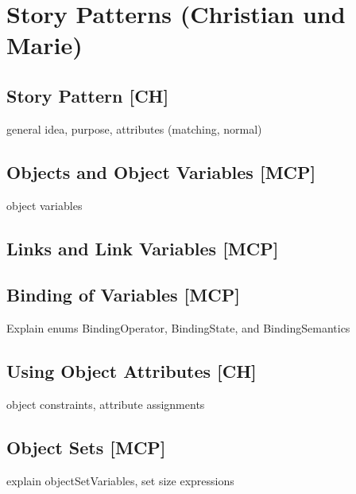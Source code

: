 \section{Story Patterns (Christian und Marie)} \label{sec:StoryPatterns}



\subsection{Story Pattern [CH]}

general idea, purpose, attributes (matching, normal)

\subsection{Objects and Object Variables [MCP]}

object variables

\subsection{Links and Link Variables [MCP]}

\subsection{Binding of Variables [MCP]}

Explain enums BindingOperator, BindingState, and BindingSemantics

\subsection{Using Object Attributes [CH]}

object constraints, attribute assignments

\subsection{Object Sets [MCP]}

explain objectSetVariables, set size expressions



